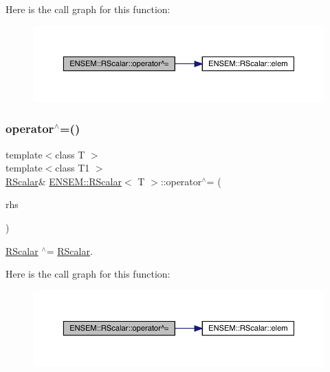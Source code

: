 Here is the call graph for this function\+:
\nopagebreak
\begin{figure}[H]
\begin{center}
\leavevmode
\includegraphics[width=350pt]{d0/d8c/classENSEM_1_1RScalar_ad69bdf7cec58f8ef8a8a42b250d97b25_cgraph}
\end{center}
\end{figure}
\mbox{\label{classENSEM_1_1RScalar_ad69bdf7cec58f8ef8a8a42b250d97b25}} 
\subsubsection{\texorpdfstring{operator$^\wedge$=()}{operator^=()}\hspace{0.1cm}{\footnotesize\ttfamily [2/3]}}
{\footnotesize\ttfamily template$<$class T $>$ \\
template$<$class T1 $>$ \\
\mbox{\hyperlink{classENSEM_1_1RScalar}{R\+Scalar}}\& \mbox{\hyperlink{classENSEM_1_1RScalar}{E\+N\+S\+E\+M\+::\+R\+Scalar}}$<$ T $>$\+::operator$^\wedge$= (\begin{DoxyParamCaption}\item[{const \mbox{\hyperlink{classENSEM_1_1RScalar}{R\+Scalar}}$<$ T1 $>$ \&}]{rhs }\end{DoxyParamCaption})\hspace{0.3cm}{\ttfamily [inline]}}



\mbox{\hyperlink{classENSEM_1_1RScalar}{R\+Scalar}} $^\wedge$= \mbox{\hyperlink{classENSEM_1_1RScalar}{R\+Scalar}}. 

Here is the call graph for this function\+:
\nopagebreak
\begin{figure}[H]
\begin{center}
\leavevmode
\includegraphics[width=350pt]{d0/d8c/classENSEM_1_1RScalar_ad69bdf7cec58f8ef8a8a42b250d97b25_cgraph}
\end{center}
\end{figure}
\mbox{\label{classENSEM_1_1RScalar_ad69bdf7cec58f8ef8a8a42b250d97b25}} 
